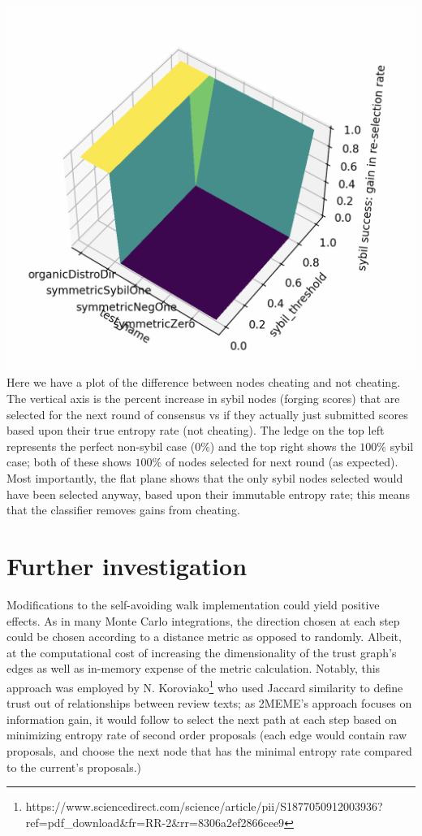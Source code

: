 \documentclass{article}
\begin{document}
\includegraphics[width=\textwidth, height=\textwidth]{attack-success-suface-plot}
Here we have a plot of the difference between nodes cheating and not cheating. The vertical axis is the percent increase in sybil nodes (forging scores) that are selected for the next round of consensus vs if they actually just submitted scores based upon their true entropy rate (not cheating). The ledge on the top left represents the perfect non-sybil case (0\%) and the top right shows the $100\%$ sybil case; both of these shows $100\%$ of nodes selected for next round (as expected). Most importantly, the flat plane shows that the only sybil nodes selected would have been selected anyway, based upon their immutable entropy rate; this means that the classifier removes gains from cheating.

\section{Further investigation}
	Modifications to the self-avoiding walk implementation could yield positive effects. As in many Monte Carlo integrations, the direction chosen at each step could be chosen according to a distance metric as opposed to randomly. Albeit, at the computational cost of increasing the dimensionality of the trust graph’s edges as well as in-memory expense of the metric calculation. Notably, this approach was employed by N. Koroviako\footnote{https://www.sciencedirect.com/science/article/pii/S1877050912003936?ref=pdf\_download\&fr=RR-2\&rr=8306a2ef2866cee9} who used Jaccard similarity to define trust out of relationships between review texts; as 2MEME's approach focuses on information gain, it would follow to select the next path at each step based on minimizing entropy rate of second order proposals (each edge would contain raw proposals, and choose the next node that has the minimal entropy rate compared to the current’s proposals.)
	
\end{document}

